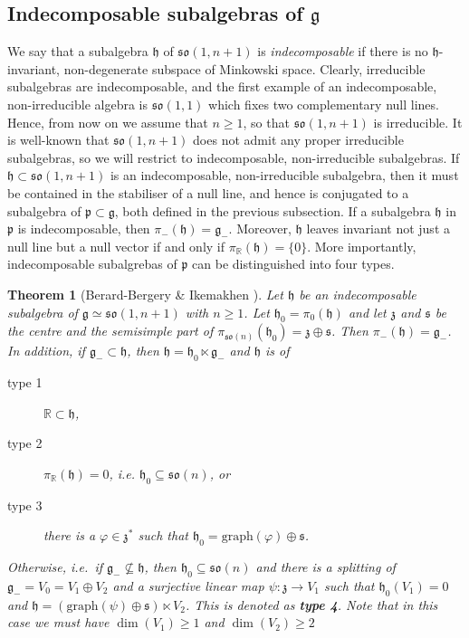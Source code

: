 \documentclass[11pt,a4paper]{amsart}
\newcommand{\vf}{\varphi}
\newcommand{\p}{\mathfrak{p}}
\newcommand{\g}{\mathfrak{g}}
\newcommand{\h}{\mathfrak{h}}
\newcommand{\z}{\mathfrak{z}}
\newcommand{\s}{\mathfrak{s}}
\newcommand{\+}{\oplus}
\newcommand{\so}{\mathfrak{so}}
\newcommand{\1}{\mathbf{1}}
\newcommand{\R}{\mathbb{R}} %
\newcommand{\<}{\langle}
\renewcommand{\>}{\rangle}
\theoremstyle{definition}
\theoremstyle{plain}
\newtheorem{theorem}[definition]{Theorem}
\numberwithin{equation}{section}
\begin{document}
\subsection{Indecomposable subalgebras of $\g$}
We say that a subalgebra $\h$ of $\so(1,n+1)$ is {\em indecomposable} if there is no $\h$-invariant, non-degenerate subspace of Minkowski space. 
Clearly, irreducible subalgebras are indecomposable, and the first example of an indecomposable, non-irreducible algebra is $\so(1,1)$ which fixes two complementary null lines. Hence, from now on we assume that $n\ge 1$, so that $\so(1,n+1)$ is irreducible.
It is well-known \cite{benoist-harpe03,olmos-discala01,att05} that $\so(1,n+1)$ does not admit any proper irreducible subalgebras, so we will restrict to indecomposable, non-irreducible subalgebras. If $\h\subset \so(1,n+1)$ is an indecomposable, non-irreducible subalgebra, then it must be contained in the stabiliser of a null line, and hence is conjugated to a subalgebra of $\p\subset \g$, both  defined in the previous subsection.
If a subalgebra $\h$ in $\p$ is indecomposable, then $\pi_-(\h)=\g_-$. Moreover, $\h$ leaves invariant not just a null line but a null vector if and only if $\pi_\R(\h)=\{0\}$.
More importantly, indecomposable subalgrebas of $\p$ can be distinguished into four types.
\begin{theorem}[Berard-Bergery \& Ikemakhen \cite{bb-ike93}]\label{bb-ike-theo}
Let $\h$ be an indecomposable subalgebra of $\g\simeq\so(1,n+1)$ with $n\ge 1$. Let  $\h_0=\pi_0(\h)$ and let $\z$ and $\s$ be the centre and the semisimple part of  $\pi_{\so(n)}(\h_0)=\z\+\s$. Then $\pi_-(\h)=\g_-$. In addition, if $\g_-\subset \h$, then $\h=\h_0\ltimes \g_-$ and $\h$ is of 
\begin{description}
\item[type 1] $\R\subset \h$,
\item[type 2] $\pi_\R(\h)=0$, i.e. $ \h_0\subseteq \so(n)$, or
\item[type 3] there is a $\vf\in \z^*$ such that $\h_0=\mathrm{graph}(\vf)\+\s$.
\end{description}
Otherwise, i.e.~if $\g_-\not\subseteq \h$, then $\h_0\subseteq \so(n)$ and there is a splitting of $\g_-=V_0=V_1\+V_2$ and a surjective linear map $\psi:\z\to V_1 $ such that $\h_0(V_1)=0$ and  $\h=(\mathrm{graph}(\psi)\+\s)\ltimes V_2$. This is denoted as {\bf type 4}. Note that in this case we must have  $\dim(V_1)\ge 1$ and $\dim(V_2)\ge 2$ 

\end{theorem}
\end{document}
